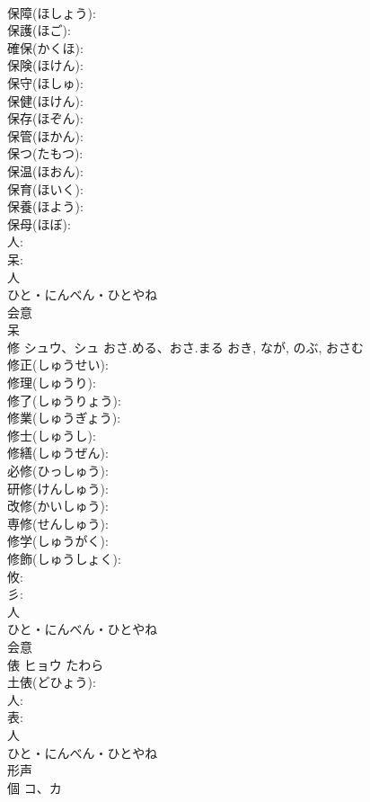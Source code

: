 \documentclass[8pt]{extreport}
\begin{document}
\begin{CJK}{UTF8}{min}
\\	保障(ほしょう): 
\\	保護(ほご): 
\\	確保(かくほ): 
\\	保険(ほけん): 
\\	保守(ほしゅ): 
\\	保健(ほけん): 
\\	保存(ほぞん): 
\\	保管(ほかん): 
\\	保つ(たもつ): 
\\	保温(ほおん): 
\\	保育(ほいく): 
\\	保養(ほよう): 
\\	保母(ほぼ): 
\\	人: 
\\	呆: 
\\	人	
\\	ひと・にんべん・ひとやね	
\\	会意 
\\	呆 
\\	修	シュウ、シュ	おさ.める、おさ.まる	おき, なが, のぶ, おさむ	
\\	修正(しゅうせい): 
\\	修理(しゅうり): 
\\	修了(しゅうりょう): 
\\	修業(しゅうぎょう): 
\\	修士(しゅうし): 
\\	修繕(しゅうぜん): 
\\	必修(ひっしゅう): 
\\	研修(けんしゅう): 
\\	改修(かいしゅう): 
\\	専修(せんしゅう): 
\\	修学(しゅうがく): 
\\	修飾(しゅうしょく): 
\\	攸: 
\\	彡: 
\\	人	
\\	ひと・にんべん・ひとやね	
\\	会意 
\\	俵	ヒョウ	たわら		
\\	土俵(どひょう): 
\\	人: 
\\	表: 
\\	人	
\\	ひと・にんべん・ひとやね	
\\	形声 
\\	個	コ、カ			

\end{CJK}
\end{document}
